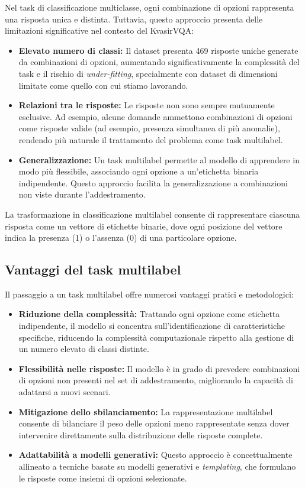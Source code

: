 \documentclass[../main.tex]{subfiles}
\begin{document}
Nel task di classificazione multiclasse, ogni combinazione di opzioni rappresenta una risposta unica e distinta. Tuttavia, questo approccio presenta delle limitazioni significative nel contesto del KvasirVQA:

\begin{itemize}
    \item \textbf{Elevato numero di classi:} Il dataset presenta 469 risposte uniche generate da combinazioni di opzioni, aumentando significativamente la complessità del task e il rischio di \textit{under-fitting}, specialmente con dataset di dimensioni limitate come quello con cui stiamo lavorando.
    \item \textbf{Relazioni tra le risposte:} Le risposte non sono sempre mutuamente esclusive. Ad esempio, alcune domande ammettono combinazioni di opzioni come risposte valide (ad esempio, presenza simultanea di più anomalie), rendendo più naturale il trattamento del problema come task multilabel.
    \item \textbf{Generalizzazione:} Un task multilabel permette al modello di apprendere in modo più flessibile, associando ogni opzione a un'etichetta binaria indipendente. Questo approccio facilita la generalizzazione a combinazioni non viste durante l'addestramento.
\end{itemize}

La trasformazione in classificazione multilabel consente di rappresentare ciascuna risposta come un vettore di etichette binarie, dove ogni posizione del vettore indica la presenza (1) o l'assenza (0) di una particolare opzione.

\subsection{Vantaggi del task multilabel}

Il passaggio a un task multilabel offre numerosi vantaggi pratici e metodologici:
\begin{itemize}
    \item \textbf{Riduzione della complessità:} Trattando ogni opzione come etichetta indipendente, il modello si concentra sull'identificazione di caratteristiche specifiche, riducendo la complessità computazionale rispetto alla gestione di un numero elevato di classi distinte.
    \item \textbf{Flessibilità nelle risposte:} Il modello è in grado di prevedere combinazioni di opzioni non presenti nel set di addestramento, migliorando la capacità di adattarsi a nuovi scenari.
    \item \textbf{Mitigazione dello sbilanciamento:} La rappresentazione multilabel consente di bilanciare il peso delle opzioni meno rappresentate senza dover intervenire direttamente sulla distribuzione delle risposte complete.
    \item \textbf{Adattabilità a modelli generativi:} Questo approccio è concettualmente allineato a tecniche basate su modelli generativi e \textit{templating}, che formulano le risposte come insiemi di opzioni selezionate.
\end{itemize}
\end{document}
